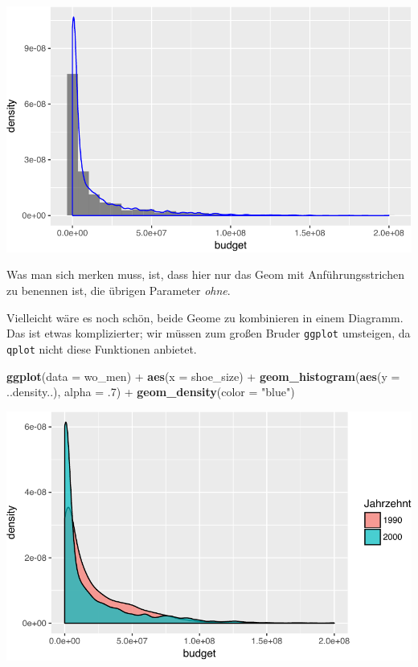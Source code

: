 \documentclass[12pt,]{book}
\newenvironment{Shaded}{\begin{snugshade}}{\end{snugshade}}
\newcommand{\KeywordTok}[1]{\textcolor[rgb]{0.13,0.29,0.53}{\textbf{{#1}}}}
\newcommand{\DataTypeTok}[1]{\textcolor[rgb]{0.13,0.29,0.53}{{#1}}}
\newcommand{\DecValTok}[1]{\textcolor[rgb]{0.00,0.00,0.81}{{#1}}}
\newcommand{\StringTok}[1]{\textcolor[rgb]{0.31,0.60,0.02}{{#1}}}
\newcommand{\NormalTok}[1]{{#1}}
\begin{document}
\begin{center}\includegraphics[width=0.7\linewidth]{050_Daten_visualisieren_files/figure-latex/unnamed-chunk-10-1} \end{center}

Was man sich merken muss, ist, dass hier nur das Geom mit
Anführungsstrichen zu benennen ist, die übrigen Parameter \emph{ohne}.

Vielleicht wäre es noch schön, beide Geome zu kombinieren in einem
Diagramm. Das ist etwas komplizierter; wir müssen zum großen Bruder
\texttt{ggplot} umsteigen, da \texttt{qplot} nicht diese Funktionen
anbietet.

\begin{Shaded}
\begin{Highlighting}[]
\KeywordTok{ggplot}\NormalTok{(}\DataTypeTok{data =} \NormalTok{wo_men) +}
\StringTok{  }\KeywordTok{aes}\NormalTok{(}\DataTypeTok{x =} \NormalTok{shoe_size) +}
\StringTok{  }\KeywordTok{geom_histogram}\NormalTok{(}\KeywordTok{aes}\NormalTok{(}\DataTypeTok{y =} \NormalTok{..density..), }\DataTypeTok{alpha =} \NormalTok{.}\DecValTok{7}\NormalTok{) +}
\StringTok{  }\KeywordTok{geom_density}\NormalTok{(}\DataTypeTok{color =} \StringTok{"blue"}\NormalTok{)}
\end{Highlighting}
\end{Shaded}

\begin{center}\includegraphics[width=0.7\linewidth]{050_Daten_visualisieren_files/figure-latex/unnamed-chunk-11-1} \end{center}
\end{document}
